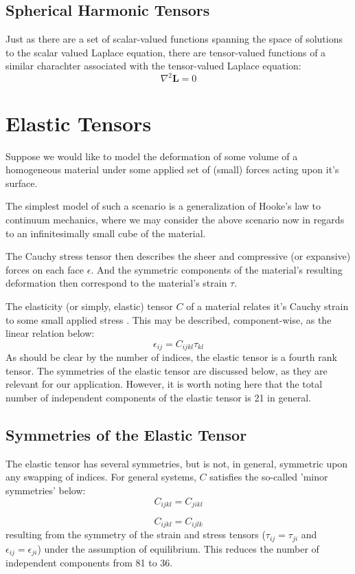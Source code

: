 \documentclass[10pt,a4paper]{article}
\begin{document}
\subsection{Spherical Harmonic Tensors}
Just as there are a set of scalar-valued functions spanning the space of solutions to the scalar valued Laplace equation, there are tensor-valued functions of a similar charachter associated with the tensor-valued Laplace equation:
$$
\nabla^2 \mathbf{L} = 0
$$

\section{Elastic Tensors}
Suppose we would like to model the deformation of some volume of a homogeneous material under some applied set of (small) forces acting upon it's surface.

The simplest model of such a scenario is a generalization of Hooke's law to continuum mechanics, where we may consider the above scenario now in regards to an infinitesimally small cube of the material. 

The Cauchy stress tensor then describes the sheer and compressive (or expansive) forces on each face $\epsilon$. And the symmetric components of the material's resulting deformation then correspond to the material's strain $\tau$.

The elasticity (or simply, elastic) tensor $C$ of a material relates it's Cauchy strain  to some small applied stress . This may be described, component-wise, as the linear relation below:
$$
\epsilon_{ij}=C_{ijkl}\tau_{kl}
$$
As should be clear by the number of indices, the elastic tensor is a fourth rank tensor. The symmetries of the elastic tensor are discussed below, as they are relevant for our application. However, it is worth noting here that the total number of independent components of the elastic tensor is 21 in general.


\subsection{Symmetries of the Elastic Tensor}

The elastic tensor has several symmetries, but is not, in general, symmetric upon any swapping of indices. For general systems, $C$ satisfies the so-called 'minor symmetries' below:
$$
C_{ijkl}=C_{jikl}
$$

$$
C_{ijkl}=C_{ijlk}
$$
resulting from the symmetry of the strain and stress tensors ($\tau_{ij}=\tau_{ji}$ and $\epsilon_{ij}=\epsilon_{ji}$) under the assumption of equilibrium. This reduces the number of independent components from 81 to 36.
\end{document}
